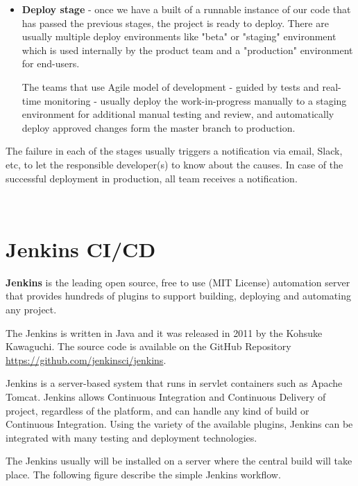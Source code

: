 \documentclass[12pt,a4paper,twoside]{article}
\begin{document}
\begin{itemize}
	\item \textbf{Deploy stage} - once we have a built of a runnable instance of our code that has passed the previous stages, the project is ready to deploy. There are usually multiple deploy environments like "beta" or "staging" environment which is used internally by the product team and a "production" environment for end-users.

The teams that use Agile model of development - guided by tests and real-time monitoring - usually deploy the work-in-progress manually to a staging environment for additional manual testing and review, and automatically deploy approved changes form the master branch to production.
\end{itemize}

The failure in each of the stages usually triggers a notification via email, Slack, etc, to let the responsible developer(s) to know about the causes. In case of the successful deployment in production, all team receives a notification.



~\newpage


\section{Jenkins CI/CD}


\textbf{Jenkins} is the leading open source, free to use (MIT License) automation server that provides hundreds of plugins to support building, deploying and automating any project. 

The Jenkins is written in Java and it was released in 2011 by the Kohsuke Kawaguchi. The source code is available on the GitHub Repository \url{https://github.com/jenkinsci/jenkins}.

Jenkins is a server-based system that runs in servlet containers such as Apache Tomcat. Jenkins allows Continuous Integration and Continuous Delivery of project, regardless of the platform, and can handle any kind of build or Continuous Integration. Using the variety of the available plugins, Jenkins can be integrated with many testing and deployment technologies.


The Jenkins usually will be installed on a server where the central build will take place. The following figure describe the simple Jenkins workflow.
\end{document}
